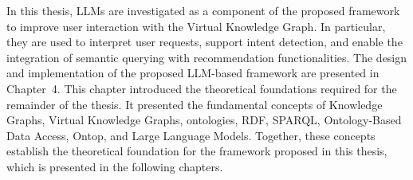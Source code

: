 In this thesis, LLMs are investigated as a component of the proposed framework to improve user interaction with the Virtual Knowledge Graph. In particular, they are used to interpret user requests, support intent detection, and enable the integration of semantic querying with recommendation functionalities. The design and implementation of the proposed LLM-based framework are presented in Chapter~4.
This chapter introduced the theoretical foundations required for the remainder of the thesis. It presented the fundamental concepts of Knowledge Graphs, Virtual Knowledge Graphs, ontologies, RDF, SPARQL, Ontology-Based Data Access, Ontop, and Large Language Models. Together, these concepts establish the theoretical foundation for the framework proposed in this thesis, which is presented in the following chapters.
